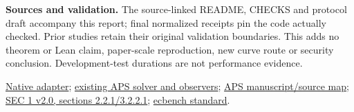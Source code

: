 \documentclass[10pt]{article}
\begin{document}
\textbf{Sources and validation.} The source-linked README, CHECKS and protocol
draft accompany this report; final normalized receipts pin the code actually
checked. Prior studies retain their original validation boundaries. This adds
no theorem or Lean claim, paper-scale reproduction, new curve route or
security conclusion. Development-test durations are not performance evidence.

\small
\href{https://github.com/isogeny-labs/crypto/blob/3d504e2062016046f854307a82e1026df199cbd6/src/cryptanalysis/ecbench/aps/mod.rs}{Native adapter};
\href{https://github.com/isogeny-labs/crypto/blob/3d504e2062016046f854307a82e1026df199cbd6/src/cryptanalysis/aps_single_relation.rs}{existing APS solver and observers};
\href{https://github.com/isogeny-labs/crypto/blob/main/research/aps_followup_20261028/README.md}{APS manuscript/source map};
\href{https://www.secg.org/sec1-v2.pdf}{SEC 1 v2.0, sections 2.2.1/3.2.2.1};
\href{https://github.com/isogeny-labs/crypto/blob/main/docs/ecbench/README.md}{ecbench standard}.
\end{document}
